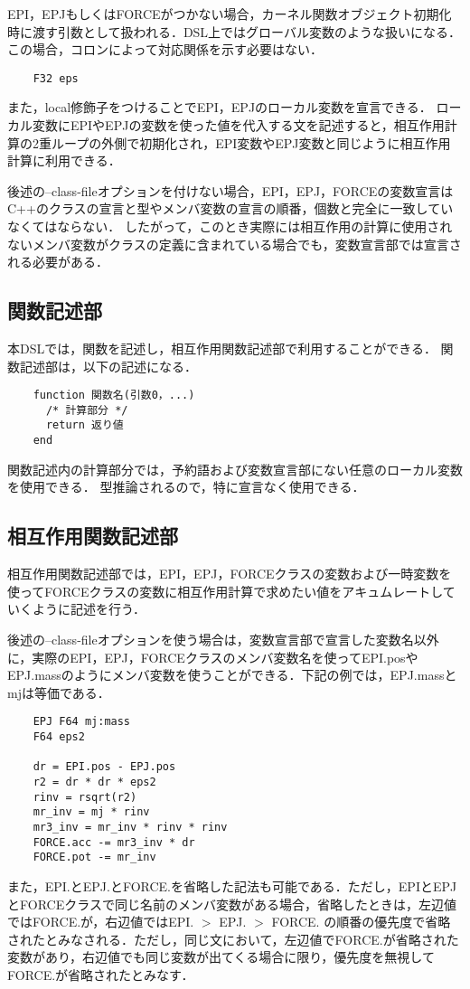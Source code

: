 \documentclass{article}
\begin{document}
EPI，EPJもしくはFORCEがつかない場合，カーネル関数オブジェクト初期化時に渡す引数として扱われる．DSL上ではグローバル変数のような扱いになる．
この場合，コロンによって対応関係を示す必要はない．
\begin{verbatim}
	F32 eps
\end{verbatim}

また，local修飾子をつけることでEPI，EPJのローカル変数を宣言できる．
ローカル変数にEPIやEPJの変数を使った値を代入する文を記述すると，相互作用計算の2重ループの外側で初期化され，EPI変数やEPJ変数と同じように相互作用計算に利用できる．

後述の--class-fileオプションを付けない場合，EPI，EPJ，FORCEの変数宣言はC++のクラスの宣言と型やメンバ変数の宣言の順番，個数と完全に一致していなくてはならない．
したがって，このとき実際には相互作用の計算に使用されないメンバ変数がクラスの定義に含まれている場合でも，変数宣言部では宣言される必要がある．

\subsection{関数記述部}
本DSLでは，関数を記述し，相互作用関数記述部で利用することができる．
関数記述部は，以下の記述になる．
\begin{verbatim}
	function 関数名(引数0，...)
	  /* 計算部分 */
	  return 返り値
	end
\end{verbatim}

関数記述内の計算部分では，予約語および変数宣言部にない任意のローカル変数を使用できる．
型推論されるので，特に宣言なく使用できる．

\subsection{相互作用関数記述部} \label{subsec:kernel}
相互作用関数記述部では，EPI，EPJ，FORCEクラスの変数および一時変数を使ってFORCEクラスの変数に相互作用計算で求めたい値をアキュムレートしていくように記述を行う．

後述の--class-fileオプションを使う場合は，変数宣言部で宣言した変数名以外に，実際のEPI，EPJ，FORCEクラスのメンバ変数名を使ってEPI.posやEPJ.massのようにメンバ変数を使うことができる．下記の例では，EPJ.massとmjは等価である．
\begin{verbatim}
	EPJ F64 mj:mass
	F64 eps2

	dr = EPI.pos - EPJ.pos
	r2 = dr * dr * eps2
	rinv = rsqrt(r2)
	mr_inv = mj * rinv
	mr3_inv = mr_inv * rinv * rinv
	FORCE.acc -= mr3_inv * dr
	FORCE.pot -= mr_inv
\end{verbatim}
また，EPI.とEPJ.とFORCE.を省略した記法も可能である．ただし，EPIとEPJとFORCEクラスで同じ名前のメンバ変数がある場合，省略したときは，左辺値ではFORCE.が，右辺値ではEPI. $>$ EPJ. $>$ FORCE. の順番の優先度で省略されたとみなされる．ただし，同じ文において，左辺値でFORCE.が省略された変数があり，右辺値でも同じ変数が出てくる場合に限り，優先度を無視してFORCE.が省略されたとみなす．
\end{document}
